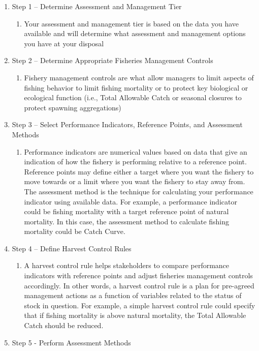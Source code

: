 \documentclass[]{book}
\providecommand{\tightlist}{%
  \setlength{\itemsep}{0pt}\setlength{\parskip}{0pt}}
\begin{document}
\begin{enumerate}
\def\labelenumi{\arabic{enumi}.}
\item
  Step 1 -- Determine Assessment and Management Tier

  \begin{enumerate}
  \def\labelenumii{\alph{enumii}.}
  \tightlist
  \item
    Your assessment and management tier is based on the data you have
    available and will determine what assessment and management options
    you have at your disposal
  \end{enumerate}
\item
  Step 2 -- Determine Appropriate Fisheries Management Controls

  \begin{enumerate}
  \def\labelenumii{\alph{enumii}.}
  \tightlist
  \item
    Fishery management controls are what allow managers to limit aspects
    of fishing behavior to limit fishing mortality or to protect key
    biological or ecological function (i.e., Total Allowable Catch or
    seasonal closures to protect spawning aggregations)
  \end{enumerate}
\item
  Step 3 -- Select Performance Indicators, Reference Points, and
  Assessment Methods

  \begin{enumerate}
  \def\labelenumii{\alph{enumii}.}
  \tightlist
  \item
    Performance indicators are numerical values based on data that give
    an indication of how the fishery is performing relative to a
    reference point. Reference points may define either a target where
    you want the fishery to move towards or a limit where you want the
    fishery to stay away from. The assessment method is the technique
    for calculating your performance indicator using available data. For
    example, a performance indicator could be fishing mortality with a
    target reference point of natural mortality. In this case, the
    assessment method to calculate fishing mortality could be Catch
    Curve.
  \end{enumerate}
\item
  Step 4 -- Define Harvest Control Rules

  \begin{enumerate}
  \def\labelenumii{\alph{enumii}.}
  \tightlist
  \item
    A harvest control rule helps stakeholders to compare performance
    indicators with reference points and adjust fisheries management
    controls accordingly. In other words, a harvest control rule is a
    plan for pre-agreed management actions as a function of variables
    related to the status of stock in question. For example, a simple
    harvest control rule could specify that if fishing mortality is
    above natural mortality, the Total Allowable Catch should be
    reduced.
  \end{enumerate}
\item
  Step 5 - Perform Assessment Methods


\end{enumerate}
\end{document}
